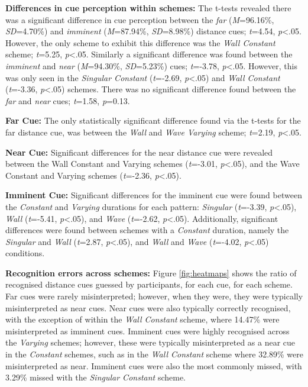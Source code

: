 \documentclass{mpaper}
\begin{document}
\textbf{Differences in cue perception within schemes:} The t-tests revealed there was a significant difference in cue perception between the \textit{far} (\textit{M}=96.16\%, \textit{SD}=4.70\%) and \textit{imminent} (\textit{M}=87.94\%, \textit{SD}=8.98\%) distance cues; \textit{t}=4.54, \textit{p}<.05. However, the only scheme to exhibit this difference was the \textit{Wall Constant} scheme; \textit{t}=5.25, \textit{p}<.05. Similarly a significant difference was found between the \textit{imminent} and \textit{near} (\textit{M}=94.30\%, \textit{SD}=5.23\%) cues; \textit{t}=-3.78, \textit{p}<.05. However, this was only seen in the \textit{Singular Constant} (\textit{t}=-2.69, \textit{p}<.05) and \textit{Wall Constant} (\textit{t}=-3.36, \textit{p}<.05) schemes. There was no significant difference found between the \textit{far} and \textit{near} cues; \textit{t}=1.58, \textit{p}=0.13.

\textbf{Far Cue:} The only statistically significant difference found via the t-tests for the far distance cue, was between the \textit{Wall} and \textit{Wave Varying} scheme; \textit{t}=2.19, \textit{p}<.05.

\textbf{Near Cue:} Significant differences for the near distance cue were revealed between the Wall Constant and Varying schemes (\textit{t}=-3.01, \textit{p}<.05), and the Wave Constant and Varying schemes (\textit{t}=-2.36, \textit{p}<.05). 

\textbf{Imminent Cue:} Significant differences for the imminent cue were found between the \textit{Constant} and \textit{Varying} durations for each pattern: \textit{Singular} (\textit{t}=-3.39, \textit{p}<.05), \textit{Wall} (\textit{t}=-5.41, \textit{p}<.05), and \textit{Wave} (\textit{t}=-2.62, \textit{p}<.05). Additionally, significant differences were found between schemes with a \textit{Constant} duration, namely the \textit{Singular} and \textit{Wall} (\textit{t}=2.87, \textit{p}<.05), and \textit{Wall} and \textit{Wave} (\textit{t}=-4.02, \textit{p}<.05) conditions.

\textbf{Recognition errors across schemes:} Figure \ref{fig:heatmaps} shows the ratio of recognised distance cues guessed by participants, for each cue, for each scheme. Far cues were rarely misinterpreted; however, when they were, they were typically misinterpreted as near cues. Near cues were also typically correctly recognised, with the exception of within the \textit{Wall Constant} scheme, where 14.47\% were misinterpreted as imminent cues. Imminent cues were highly recognised across the \textit{Varying} schemes; however, these were typically misinterpreted as a near cue in the \textit{Constant} schemes, such as in the \textit{Wall Constant} scheme where 32.89\% were misinterpreted as near. Imminent cues were also the most commonly missed, with 3.29\% missed with the \textit{Singular Constant} scheme. 
\end{document}
